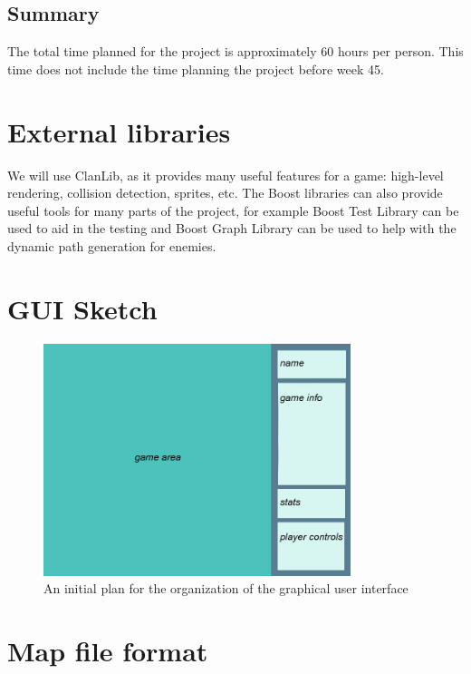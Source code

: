 \documentclass[11pt]{article}
\begin{document}
\subsection*{Summary}

The total time planned for the project is approximately 60 hours per
person. This time does not include the time planning the project
before week 45.

\section{External libraries}
\label{sec-7}


We will use ClanLib, as it provides many useful features for a game:
high-level rendering, collision detection, sprites, etc. The Boost
libraries can also provide useful tools for many parts of the project,
for example Boost Test Library can be used to aid in the testing and
Boost Graph Library can be used to help with the dynamic path
generation for enemies.



\appendix
\clearpage
\section{GUI Sketch}

\begin{figure}[h]
  \centering
  \includegraphics[width=0.8\textwidth]{sketch.png}
  \caption{An initial plan for the organization of the graphical user
    interface}
\end{figure}

\clearpage
\section{Map file format}
\end{document}
